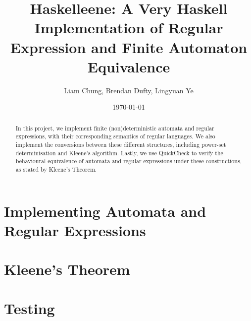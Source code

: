 \documentclass[12pt]{article}
\title{Haskelleene: A Very Haskell Implementation of Regular Expression and
 Finite Automaton Equivalence}
\author{Liam Chung, Brendan Dufty, Lingyuan Ye}
\date{\today}
\begin{document}
\maketitle

\begin{abstract}
In this project, we implement finite (non)deterministic automata and regular expressions, with their corresponding semantics of regular languages. We also implement the conversions between these different structures, including power-set determinisation and Kleene's algorithm. Lastly, we use QuickCheck to verify the behavioural equivalence of automata and regular expressions under these constructions, as stated by Kleene's Theorem.
\end{abstract}

\vfill

\tableofcontents

\clearpage


\section{Implementing Automata and Regular Expressions}\label{sec:Defs}





\section{Kleene's Theorem}\label{sec:Kleene}


\section{Testing}\label{sec:Testing}


% 






\end{document}
